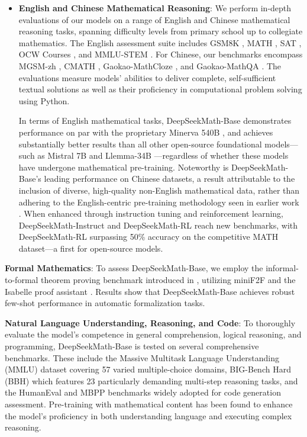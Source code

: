 \begin{itemize}[topsep=0pt]
    \item \textbf{English and Chinese Mathematical Reasoning}: We perform in-depth evaluations of our models on a range of English and Chinese mathematical reasoning tasks, spanning difficulty levels from primary school up to collegiate mathematics. The English assessment suite includes GSM8K \citep{gsm8k}, MATH \citep{MATH}, SAT \citep{llemma}, OCW Courses \citep{minerva}, and MMLU-STEM \citep{mmlu}. For Chinese, our benchmarks encompass MGSM-zh \citep{mgsm}, CMATH \citep{wei2023cmath}, Gaokao-MathCloze \citep{agieval}, and Gaokao-MathQA \citep{agieval}. The evaluations measure models' abilities to deliver complete, self-sufficient textual solutions as well as their proficiency in computational problem solving using Python.

    In terms of English mathematical tasks, DeepSeekMath-Base demonstrates performance on par with the proprietary Minerva 540B \citep{minerva}, and achieves substantially better results than all other open-source foundational models—such as Mistral 7B \citep{mistral} and Llemma-34B \citep{llemma}—regardless of whether these models have undergone mathematical pre-training. Noteworthy is DeepSeekMath-Base's leading performance on Chinese datasets, a result attributable to the inclusion of diverse, high-quality non-English mathematical data, rather than adhering to the English-centric pre-training methodology seen in earlier work \citep{minerva,llemma}. When enhanced through instruction tuning and reinforcement learning, DeepSeekMath-Instruct and DeepSeekMath-RL reach new benchmarks, with DeepSeekMath-RL surpassing 50\% accuracy on the competitive MATH dataset—a first for open-source models.
\end{itemize}

\item \textbf{Formal Mathematics}: To assess DeepSeekMath-Base, we employ the informal-to-formal theorem proving benchmark introduced in \citep{dsp_proof}, utilizing miniF2F \citep{minif2f} and the Isabelle proof assistant \citep{isabelle}. Results show that DeepSeekMath-Base achieves robust few-shot performance in automatic formalization tasks.
\item \textbf{Natural Language Understanding, Reasoning, and Code}: To thoroughly evaluate the model's competence in general comprehension, logical reasoning, and programming, DeepSeekMath-Base is tested on several comprehensive benchmarks. These include the Massive Multitask Language Understanding (MMLU) dataset \citep{mmlu} covering 57 varied multiple-choice domains, BIG-Bench Hard (BBH) \citep{bbh} which features 23 particularly demanding multi-step reasoning tasks, and the HumanEval \citep{codex} and MBPP \citep{mbpp} benchmarks widely adopted for code generation assessment. Pre-training with mathematical content has been found to enhance the model's proficiency in both understanding language and executing complex reasoning.

